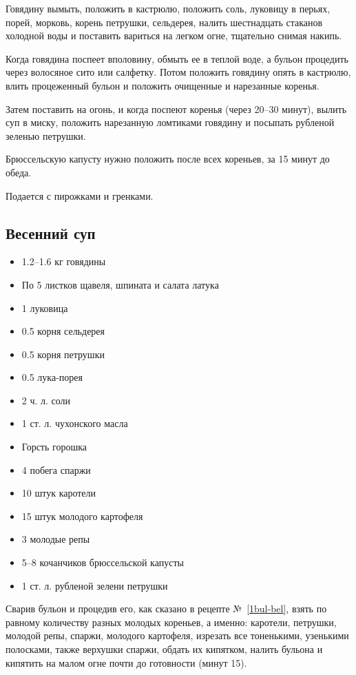 Говядину вымыть, положить в кастрюлю, положить соль, луковицу в перьях, порей, морковь, корень петрушки, сельдерея, налить шестнадцать стаканов холодной воды и поставить вариться на легком огне, тщательно снимая накипь.

Когда говядина поспеет вполовину, обмыть ее в теплой воде, а бульон процедить через волосяное сито или салфетку. Потом положить говядину опять в кастрюлю, влить процеженный бульон и положить очищенные и нарезанные коренья.

Затем поставить на огонь, и когда поспеют коренья (через 20–30 минут), вылить суп в миску, положить нарезанную ломтиками говядину и посыпать рубленой зеленью петрушки.

Брюссельскую капусту нужно положить после всех кореньев, за 15 минут до обеда.

Подается с пирожками и гренками.

\subsection{Весенний суп}\label{4vesen-sup}

\begin{itemize}
	\item 1.2–1.6 кг говядины 
    \item По 5 листков щавеля, шпината и салата латука 
    \item 1 луковица 
    \item 0.5 корня сельдерея 
    \item 0.5 корня петрушки 
    \item 0.5 лука-порея 
    \item 2 ч. л. соли 
    \item 1 ст. л. чухонского масла 
    \item Горсть горошка 
    \item 4 побега спаржи 
    \item 10 штук каротели 
    \item 15 штук молодого картофеля 
    \item 3 молодые репы 
    \item 5–8 кочанчиков брюссельской капусты 
    \item 1 ст. л. рубленой зелени петрушки
\end{itemize}

Сварив бульон и процедив его, как сказано в рецепте №~\ref{1bul-bel}, взять по равному количеству разных молодых кореньев, а именно: каротели, петрушки, молодой репы, спаржи, молодого картофеля, изрезать все тоненькими, узенькими полосками, также верхушки спаржи, обдать их кипятком, налить бульона и кипятить на малом огне почти до готовности (минут 15).

